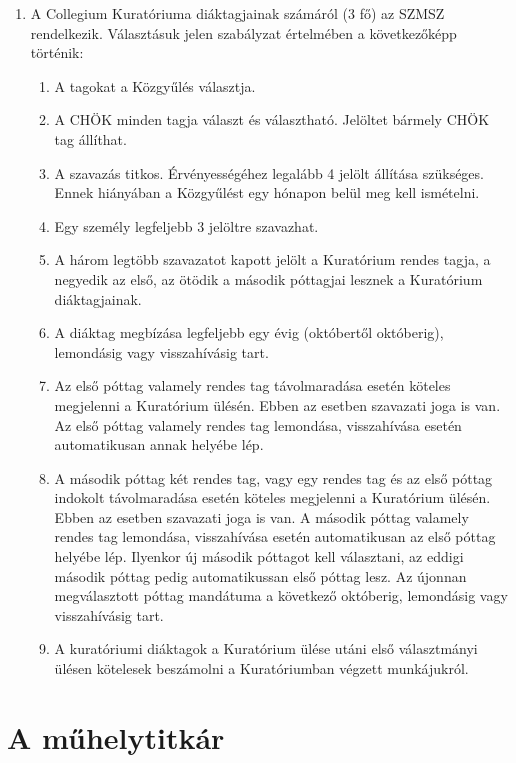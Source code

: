 \documentclass{../styles/rulebook}
\begin{document}
\begin{enumerate}
	\item A Collegium Kuratóriuma diáktagjainak számáról (3 fő) az SZMSZ rendelkezik. Választásuk jelen szabályzat értelmében a következőképp történik: 
	\begin{enumerate}
		\item A tagokat a Közgyűlés választja.
		\item A CHÖK minden tagja választ és választható. Jelöltet bármely CHÖK tag állíthat.
		\item A szavazás titkos. Érvényességéhez legalább 4 jelölt állítása szükséges. Ennek hiányában a Közgyűlést egy hónapon belül meg kell ismételni.
		\item Egy személy legfeljebb 3 jelöltre szavazhat.
		\item A három legtöbb szavazatot kapott jelölt a Kuratórium rendes tagja, a negyedik az első, az ötödik a második póttagjai lesznek a Kuratórium diáktagjainak.
		\item A diáktag megbízása legfeljebb egy évig (októbertől októberig), lemondásig vagy visszahívásig tart.
		\item Az első póttag valamely rendes tag távolmaradása esetén köteles megjelenni a Kuratórium ülésén. Ebben az esetben szavazati joga is van. Az első póttag valamely rendes tag lemondása, visszahívása esetén automatikusan annak helyébe lép.
		\item A második póttag két rendes tag, vagy egy rendes tag és az első póttag indokolt távolmaradása esetén köteles megjelenni a Kuratórium ülésén. Ebben az esetben szavazati joga is van. A második póttag valamely rendes tag lemondása, visszahívása esetén automatikusan az első póttag helyébe lép. Ilyenkor új második póttagot kell választani, az eddigi második póttag pedig automatikussan első póttag lesz. Az újonnan megválasztott póttag mandátuma a következő októberig, lemondásig vagy visszahívásig tart.
		\item A kuratóriumi diáktagok a Kuratórium ülése utáni első választmányi ülésen kötelesek beszámolni a Kuratóriumban végzett munkájukról.
	\end{enumerate}
\end{enumerate}


\section{A műhelytitkár}
\end{document}
